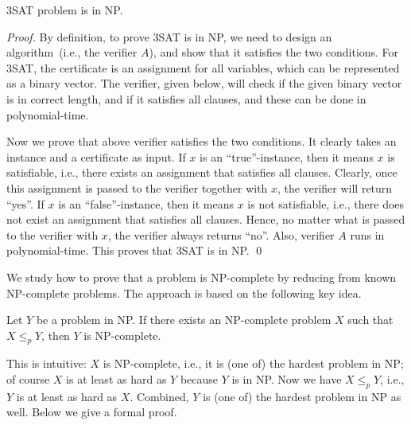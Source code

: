\begin{fact}
3SAT problem is in NP.
\end{fact}
\emph{Proof.} By definition, to prove 3SAT is in NP, we need to design an
algorithm~(i.e., the verifier $A$), and show that it satisfies the two
conditions. For 3SAT, the certificate is an assignment for all variables,
which can be represented as a binary vector. The verifier, given below, will check
if the given binary vector is in correct length, and if it satisfies all clauses,
and these can be done in polynomial-time.

\begin{algorithmblock}[0.8\textwidth]
	\xxx
	\xxx
	\xxx
	\xxx
\end{algorithmblock}

Now we prove that above verifier satisfies the two conditions.
It clearly takes an instance and a certificate as input.
If $x$ is an ``true''-instance, then it means $x$ is satisfiable, i.e.,
there exists an assignment that satisfies all clauses.
Clearly, once this assignment is passed to the verifier together with $x$,
the verifier will return ``yes''.
If $x$ is an ``false''-instance, then it means $x$ is not satisfiable, i.e.,
there does not exist an assignment that satisfies all clauses.
Hence, no matter what is passed to the verifier with $x$,
the verifier always returns ``no''. Also, verifier $A$ runs in polynomial-time.
This proves that 3SAT is in NP.
\qed




We study how to prove that a problem is NP-complete by reducing from known
NP-complete problems. The approach is based on the following key idea.

\begin{fact}
Let $Y$ be a problem in NP. If there exists an NP-complete problem $X$ such that $X\le_p Y$,
then $Y$ is NP-complete.
\end{fact}

This is intuitive: $X$ is NP-complete, i.e., it is (one of) the hardest problem
in NP; of course $X$ is at least as hard as $Y$ because $Y$ is in NP.
Now we have $X\le_p Y$, i.e., $Y$ is at least as hard as $X$. Combined, $Y$ is (one of) the
hardest problem in NP as well. Below we give a formal proof.

